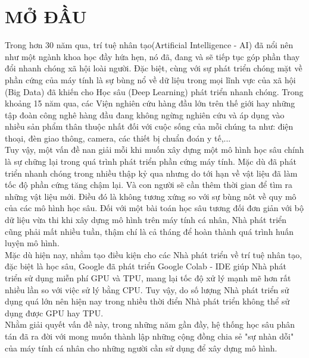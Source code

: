 \documentclass[11pt,a4paper]{article}
\numberwithin{equation}{subsection}
\numberwithin{figure}{subsection}
\numberwithin{table}{subsection}
\begin{document}
\newpage


\section*{MỞ ĐẦU}
Trong hơn 30 năm qua, trí tuệ nhân tạo(Artificial Intelligence - AI) đã nổi nên như một ngành khoa học đầy hứa hẹn, nó đã, đang và sẽ tiếp tục góp phần thay đổi nhanh chóng xã hội loài người. Đặc biệt, cùng với sự phát triển chóng mặt về phần cứng của máy tính là sự bùng nổ về dữ liệu trong mọi lĩnh vực của xã hội (Big Data) đã khiến cho Học sâu (Deep Learning) phát triển nhanh chóng. Trong khoảng 15 năm qua, các Viện nghiên cứu hàng đầu lớn trên thế giới hay những tập đoàn công nghê hàng đầu đang không ngừng nghiên cứu và áp dụng vào nhiều sản phẩm thân thuộc nhất đối với cuộc sống của mỗi chúng ta như: điện thoại, đèn giao thông, camera, các thiết bị chuẩn đoán y tế,...\\

Tuy vậy, một vấn đề nan giải mỗi khi muốn xây dựng một mô hình học sâu chính là sự chững lại trong quá trình phát triển phần cứng máy tính. Mặc dù đã phát triển nhanh chóng trong nhiều thập kỷ qua nhưng do tới hạn về vật liệu đã làm tốc độ phần cứng tăng chậm lại. Và con người sẽ cần thêm thời gian để tìm ra những vật liệu mới. Điều đó là không tương xứng so với sự bùng nôt về quy mô của các mô hình học sâu. Đối với một bài toán học sâu tương đối đơn giản với bộ dữ liệu vừa thi khi xây dựng mô hình trên máy tính cá nhân, Nhà phát triển cũng phải mất nhiều tuần, thậm chí là cả tháng để hoàn thành quá trình huấn luyện mô hình.\\

Mặc dù hiện nay, nhằm tạo điều kiện cho các Nhà phát triển về trí tuệ nhân tạo, đặc biệt là học sâu, Google đã phát triển Google Colab - IDE giúp Nhà phát triển sử dụng miễn phí GPU và TPU, mang lại tốc độ xử lý mạnh mẽ hơn rất nhiều lần so với việc sử lý bằng CPU. Tuy vậy, do số lượng Nhà phát triển sử dụng quá lớn nên hiện nay trong nhiều thời điển Nhà phát triển không thể sử dụng được GPU hay TPU.\\

Nhằm giải quyết vấn đề này, trong những năm gần đầy, hệ thống học sâu phân tán đã ra đời với mong muốn thành lập những cộng đồng chia sẻ "sự nhàn dỗi" của máy tính cá nhân cho những người cần sử dụng để xây dựng mô hình.
 
\newpage
\end{document}
